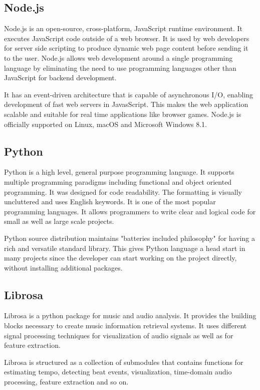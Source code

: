 \subsection{Node.js}
Node.js is an open-source, cross-platform, JavaScript runtime environment. It executes JavaScript code outside of a web browser. It is used by web developers for server side scripting to produce dynamic web page content before sending it to the user. Node.js allows web development around a single programming language by eliminating the need to use programming languages other than JavaScript for backend development. \newline

It has an event-driven architecture that is capable of asynchronous I/O, enabling development of fast web servers in JavasScript. This makes the web application scalable and suitable for real time applications like browser games. Node.js is officially supported on Linux, macOS and Microsoft Windows 8.1.

\subsection{Python}
Python is a high level, general purpose programming language. It supports multiple programming paradigms including functional and object oriented programming. It was designed for code readability. The formatting is visually uncluttered and uses English keywords. It is one of the most popular programming languages. It allows programmers to write clear and logical code for small as well as large scale projects. \newline

Python source distribution maintains "batteries included philosophy" for having a rich and versatile standard library. This gives Python language a head start in many projects since the developer can start working on the project directly, without installing additional packages. 

\subsection{Librosa}
Librosa is a python package for music and audio analysis. It provides the building blocks necessary to create music information retrieval systems. It uses different signal processing techniques for visualization of audio signals as well as for feature extraction. \newline

Librosa is structured as a collection of submodules that contains functions for estimating tempo, detecting beat events, visualization, time-domain audio processing, feature extraction and so on.

